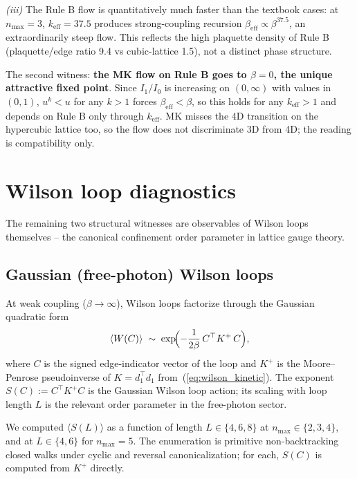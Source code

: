 \documentclass[11pt]{article}
\begin{document}
\emph{(iii)} The Rule B flow is quantitatively much faster than the textbook
cases: at $n_\text{max}=3$, $k_\text{eff}=37.5$ produces strong-coupling
recursion $\beta_\text{eff}\propto\beta^{37.5}$, an extraordinarily steep
flow. This reflects the high plaquette density of Rule B
(plaquette/edge ratio 9.4 vs cubic-lattice 1.5), not a distinct phase structure.

The second witness: \textbf{the MK flow on Rule B goes to $\beta=0$, the
unique attractive fixed point}.  Since $I_1/I_0$ is increasing on
$(0,\infty)$ with values in $(0,1)$, $u^k < u$ for any $k > 1$ forces
$\beta_\text{eff} < \beta$, so this holds for any $k_\text{eff} > 1$ and
depends on Rule B only through $k_\text{eff}$.  MK misses the 4D transition
on the hypercubic lattice too, so the flow does not discriminate 3D from 4D;
the reading is compatibility only.

\section{Wilson loop diagnostics}
\label{sec:wilson_loops}

The remaining two structural witnesses are observables of Wilson loops
themselves -- the canonical confinement order parameter in lattice gauge
theory.

\subsection{Gaussian (free-photon) Wilson loops}
\label{sec:gaussian_wilson}

At weak coupling ($\beta\to\infty$), Wilson loops factorize through the Gaussian
quadratic form
\begin{equation}
\langle W(C)\rangle\;\sim\;\exp\!\Bigl(-\frac{1}{2\beta}\,C^\top K^+\, C\Bigr),
\end{equation}
where $C$ is the signed edge-indicator vector of the loop and $K^+$ is the
Moore--Penrose pseudoinverse of $K=d_1^\top d_1$ from~(\ref{eq:wilson_kinetic}).
The exponent $S(C):=C^\top K^+ C$ is the Gaussian Wilson loop action; its
scaling with loop length $L$ is the relevant order parameter in the free-photon
sector.

We computed $\langle S(L)\rangle$ as a function of length $L\in\{4,6,8\}$ at
$n_\text{max}\in\{2,3,4\}$, and at $L\in\{4,6\}$ for $n_\text{max}=5$. The
enumeration is primitive non-backtracking closed walks under cyclic and
reversal canonicalization; for each, $S(C)$ is computed from $K^+$ directly.
\end{document}
